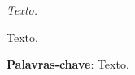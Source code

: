 \documentclass[
	12pt,				%
	openright,			%
	oneside,			%
	a4paper,			%
	english,			%
	french,				%
	spanish,			%
	brazil				%
	]{abntex2}
\begin{document}
\begin{epigrafe}
    \vspace*{\fill}
	\begin{flushright}
		\textit{Texto.}
	\end{flushright}
\end{epigrafe}


\setlength{\absparsep}{18pt}
\begin{resumo}
Texto.

\textbf{Palavras-chave}: Texto.
\end{resumo}

\listoffigures*
\cleardoublepage

\listoftables*
\cleardoublepage
\end{document}
